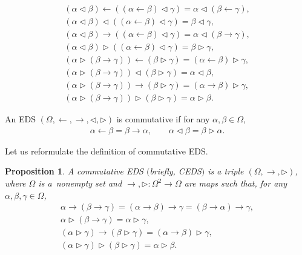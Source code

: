 \documentclass[pdftex]{sigma}
\numberwithin{equation}{section}
\newtheorem{Proposition}[Theorem]{Proposition}
 { \theoremstyle{definition}
\newtheorem{Definition}[Theorem]{Definition}
\newtheorem{Note}[Theorem]{Note}
\newtheorem{Example}[Theorem]{Example}
\newtheorem{Remark}[Theorem]{Remark}
\newtheorem{Notation}[Theorem]{Notation}}
\begin{document}
\begin{Definition}
\begin{enumerate}
\begin{enumerate}
\begin{gather}
(\alpha \triangleleft \beta)\leftarrow ((\alpha \leftarrow \beta) \triangleleft \gamma)=\alpha \triangleleft (\beta \leftarrow \gamma),\\
(\alpha \triangleleft \beta)\triangleleft ((\alpha \leftarrow \beta) \triangleleft \gamma)=\beta \triangleleft \gamma,
\\
(\alpha \triangleleft \beta) \rightarrow ((\alpha \leftarrow \beta) \triangleleft \gamma)=\alpha \triangleleft (\beta \rightarrow \gamma),\\
 (\alpha \triangleleft \beta) \triangleright ((\alpha \leftarrow \beta) \triangleleft \gamma)=\beta \triangleright \gamma,\\
(\alpha \triangleright (\beta \rightarrow \gamma))\leftarrow (\beta \triangleright \gamma)=(\alpha \leftarrow \beta) \triangleright \gamma,\\
(\alpha \triangleright (\beta \rightarrow \gamma))\triangleleft (\beta \triangleright \gamma)=\alpha \triangleleft \beta,\\
\label{eq12} (\alpha \triangleright (\beta \rightarrow \gamma))\rightarrow (\beta \triangleright \gamma)=(\alpha \rightarrow \beta)\triangleright \gamma,\\
\label{eq13} (\alpha \triangleright (\beta \rightarrow \gamma))\triangleright (\beta \triangleright \gamma)=\alpha \triangleright \beta.
\end{gather}
\end{enumerate}
\end{enumerate}
\end{Definition}

An EDS $(\Omega,\leftarrow,\rightarrow,\triangleleft,\triangleright)$ is commutative if for any $\alpha,\beta \in \Omega$,
\begin{align}
\label{eq14}\alpha \leftarrow \beta=\beta \rightarrow \alpha,\qquad\alpha \triangleleft \beta=\beta \triangleright \alpha.
\end{align}

Let us reformulate the definition of commutative EDS.

\begin{Proposition}
A commutative EDS $($briefly, CEDS$)$ is a triple $(\Omega,\rightarrow,\triangleright)$, where $\Omega$ is a~non\-empty set and $\rightarrow, \triangleright\colon\Omega^2\longrightarrow \Omega$ are maps such that, for any $\alpha,\beta,\gamma \in \Omega$,
\begin{gather}
\label{eq15} \alpha \rightarrow (\beta \rightarrow \gamma)=(\alpha \rightarrow \beta) \rightarrow \gamma=(\beta \rightarrow \alpha) \rightarrow \gamma,\\
\label{eq16} \alpha \triangleright (\beta \rightarrow \gamma)=\alpha \triangleright \gamma,\\
\label{eq17} (\alpha \triangleright \gamma)\rightarrow (\beta \triangleright \gamma)=(\alpha \rightarrow \beta)\triangleright \gamma,\\
\label{eq18} (\alpha \triangleright \gamma)\triangleright (\beta \triangleright \gamma)=\alpha \triangleright \beta.
\end{gather}\end{Proposition}
\end{document}
